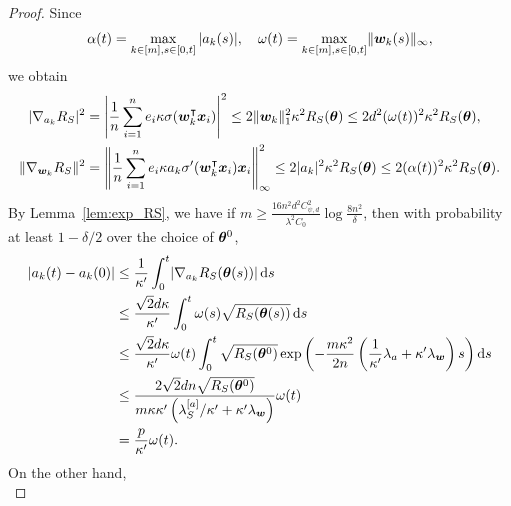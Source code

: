 \documentclass[twoside,11pt]{article}
\begin{document}
\begin{proof}
    Since
    \begin{equation*}
        \alpha(t)=\max\limits_{k\in[m],s\in[0,t]}|a_k(s)|, \quad \omega(t)=\max\limits_{k\in[m],s\in[0,t]}\lVert\bm{w}_k(s)\rVert_{\infty},
    \end{equation*}
    we obtain
    \begin{equation*}
        \begin{aligned}
            \lvert\nabla_{a_k}R_S\rvert^2    & =\left\lvert\frac{1}{n}\sum_{i=1}^n e_i\kappa\sigma(\bm{w}_k^\intercal\bm{x}_i)\right\rvert^2\leq 2\lVert\bm{w}_k\rVert^2_1\kappa^2R_S(\bm{\theta})\leq 2d^2(\omega(t))^2\kappa^2R_S(\bm{\theta}),            \\
            \lVert\nabla_{\bm{w}_k}R_S\rVert^2 & =\left\lVert\frac{1}{n}\sum_{i=1}^n e_i\kappa a_k\sigma'(\bm{w}_k^\intercal\bm{x}_i)\bm{x}_i\right\rVert^2_{\infty}\leq 2\lvert a_k\rvert^2\kappa^2R_S(\bm{\theta})\leq 2(\alpha(t))^2\kappa^2R_S(\bm{\theta}).
        \end{aligned}
    \end{equation*}
    By Lemma~\ref{lem:exp_RS}, we have if $m\geq \frac{16n^2d^2C_{\psi,d}^2}{\lambda^2C_0}\log\frac{8n^2}{\delta}$, then with probability at least $1 - \delta/2$ over the choice of $\bm{\theta}^0$,
    \begin{equation*}
        \begin{aligned}
            \lvert a_k(t) - a_k(0)\rvert
             & \leq\frac{1}{\kappa'}\int_0^t\lvert\nabla_{a_k}R_S(\bm{\theta}(s))\rvert\mathop{}\!\mathrm{d}{s}                                                                                                                   \\
             & \leq\frac{\sqrt{2}d\kappa}{\kappa'}\int_{0}^{t} \omega(s)\sqrt{R_S(\bm{\theta}(s))}\mathop{}\!\mathrm{d}{s}                                                                                                  \\
             & \leq\frac{\sqrt{2}d\kappa}{\kappa'}\omega(t)\int_{0}^{t}\sqrt{R_S(\bm{\theta}^0)}\exp\left(-\frac{m\kappa^2}{2n}\left(\frac{1}{\kappa'}\lambda_a+\kappa'\lambda_{\bm{w}}\right)s\right)\mathop{}\!\mathrm{d}{s} \\
             & \leq \frac{2\sqrt{2}dn\sqrt{R_S(\bm{\theta}^0)}}{m\kappa\kappa'\left(\lambda^{[a]}_S/\kappa'+\kappa'\lambda_{\bm{w}}\right)}\omega(t)                                                           \\
             & =\frac{p}{\kappa'}\omega(t).
        \end{aligned}
    \end{equation*}
    On the other hand,
    \begin{equation*}

\end{equation*}
\end{proof}
\end{document}
